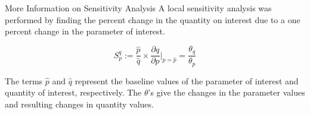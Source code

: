 \documentclass{beamer}
\begin{document}
\begin{frame}{More Information on Sensitivity Analysis}
A local sensitivity analysis was performed by finding the percent change in the quantity on interest due to a one percent change in the parameter of interest.

$$S_{p}^{q} := \frac{\hat{p}}{\hat{q}} \times \frac{\partial q}{\partial p}\bigg|_{p=\hat{p}} = \frac{\theta_q}{\theta_p}$$

The terms $\hat{p}$ and $\hat{q}$ represent the baseline values of the parameter of interest and quantity of interest, respectively. The $\theta$'s give the changes in the parameter values and resulting changes in quantity values.

\end{frame}
\end{document}
